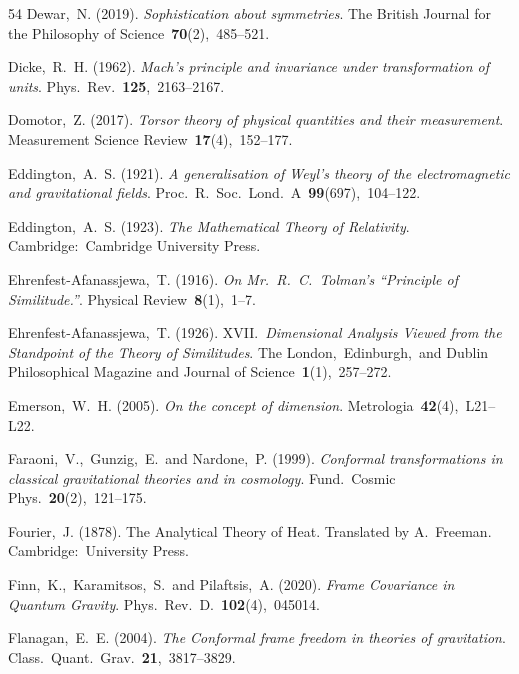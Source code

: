 \documentclass[12pt]{article}
\numberwithin{equation}{section}
\begin{document}
\begin{small}
\begin{thebibliography}{54}
{Dewar,~N.} (2019).
{\em Sophistication about symmetries}.
The British Journal for the Philosophy of Science~\textbf{70}(2),~485--521.

{Dicke,~R.~H.} (1962).
{\em Mach's principle and invariance under transformation of units}.
Phys.~Rev.~\textbf{125},~2163--2167.

{Domotor,~Z.} (2017).
{\em Torsor theory of physical quantities and their measurement}.
Measurement Science Review~\textbf{17}(4),~152--177.

{Eddington,~A.~S.} (1921).
{\em A generalisation of Weyl's theory of the electromagnetic and gravitational fields}.
Proc.~R.~Soc.~Lond.~A~\textbf{99}(697),~104--122.

{Eddington,~A.~S.} (1923).
{\em The Mathematical Theory of Relativity}.
Cambridge:~Cambridge University Press.

{Ehrenfest-Afanassjewa,~T.} (1916).
{\em On Mr.~R.~C.~Tolman's ``Principle of Similitude.''}.
Physical Review~\textbf{8}(1),~1--7.

{Ehrenfest-Afanassjewa,~T.} (1926).
{XVII.~{\em Dimensional Analysis Viewed from the Standpoint of the Theory of Similitudes}}.
The London,~Edinburgh,~and Dublin Philosophical Magazine and Journal of Science~\textbf{1}(1),~257--272.

{Emerson,~W.~H.} (2005).
{\em On the concept of dimension}.
Metrologia~\textbf{42}(4),~L21--L22.

{Faraoni,~V.,~Gunzig,~E.~and Nardone,~P.} (1999).
{\em Conformal transformations in classical gravitational theories and in cosmology}.
Fund.~Cosmic Phys.~\textbf{20}(2),~121--175.

{Fourier,~J.} (1878).
{The Analytical Theory of Heat}.
Translated by A.~Freeman.
Cambridge:~University Press.

{Finn,~K.,~Karamitsos,~S.~and Pilaftsis,~A.} (2020).
{\em Frame Covariance in Quantum Gravity}.
Phys.~Rev.~D.~\textbf{102}(4),~045014.

{Flanagan,~E.~E.} (2004).
{\em The Conformal frame freedom in theories of gravitation}.
Class.~Quant.~Grav.~\textbf{21},~3817--3829.


\end{thebibliography}
\end{small}
\end{document}
